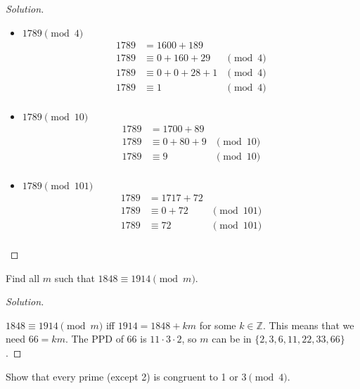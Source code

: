 \documentclass[11pt]{article}
\newcommand{\Z}{\mathbb{Z}}
\newenvironment{problem}[2][Problem]{\begin{trivlist}
\item[\hskip \labelsep {\bfseries #1}\hskip \labelsep {\bfseries #2.}]}{\end{trivlist}}
\newenvironment{solution}
  {\renewcommand\qedsymbol{$~$}\begin{proof}[Solution]$ $\par\nobreak\ignorespaces}
  {\end{proof}}
\begin{document}
\begin{solution}
    \begin{itemize}
        \item $1789 \pmod{4}$
              \begin{align*}
                  1789 & = 1600 + 189                     \\
                  1789 & \equiv 0 + 160 + 29   & \pmod{4} \\
                  1789 & \equiv 0 + 0 + 28 + 1 & \pmod{4} \\
                  1789 & \equiv  1             & \pmod{4} \\
              \end{align*}
        \item $1789 \pmod{10}$
              \begin{align*}
                  1789 & = 1700 + 89                   \\
                  1789 & \equiv 0 + 80 + 9 & \pmod{10} \\
                  1789 & \equiv  9         & \pmod{10} \\
              \end{align*}
        \item $1789 \pmod{101}$
              \begin{align*}
                  1789 & = 1717 + 72                \\
                  1789 & \equiv 0 + 72 & \pmod{101} \\
                  1789 & \equiv 72     & \pmod{101} \\
              \end{align*}
    \end{itemize}
\end{solution}



\begin{problem}{6}
Find all $m$ such that $1848 \equiv 1914 \pmod{m}.$
\end{problem}

\begin{solution}
    $1848 \equiv 1914 \pmod{m}$ iff $1914=1848 + km$ for some $k\in\Z$. This means that we need $66=km$. The PPD of 66 is $11\cdot 3 \cdot 2$, so $m$ can be in $\{2,3,6,11,22,33,66\}$.
\end{solution}


\begin{problem}{8}
Show that every prime (except 2) is congruent to 1 or 3$\pmod{4}$.
\end{problem}
\end{document}
